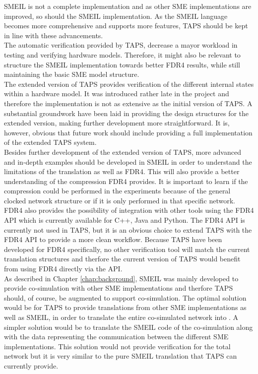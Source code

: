 
SMEIL is not a complete implementation and as other SME implementations are improved, so should the SMEIL implementation. As the SMEIL language becomes more comprehensive and supports more features, TAPS should be kept in line with these advancements.\\
The automatic verification provided by TAPS, decrease a mayor workload in testing and verifying hardware models. Therefore, it might also be relevant to structure the SMEIL implementation towards better FDR4 results, while still maintaining the basic SME model structure. \\

The extended version of TAPS provides verification of the different internal states within a hardware model. It was introduced rather late in the project and therefore the implementation is not as extensive as the initial version of TAPS. A substantial groundwork have been laid in providing the design structures for the extended version, making further development more straightforward. It is, however, obvious that future work should include providing a full implementation of the extended TAPS system. \\

Besides further development of the extended version of TAPS, more advanced and in-depth examples should be developed in SMEIL in order to understand the limitations of the translation as well as FDR4. This will also provide a better understanding of the compression FDR4 provides. It is important to learn if the compression could be performed in the experiments because of the general clocked network structure or if it is only performed in that specific network. \\

FDR4 also provides the possibility of integration with other tools using the FDR4 API which is currently available for C++, Java and Python. The FDR4 API is currently not used in TAPS, but it is an obvious choice to extend TAPS with the FDR4 API to provide a more clean workflow. Because TAPS have been developed for FDR4 specifically, no other verification tool will match the current translation structures and therfore the current version of TAPS would benefit from using FDR4 directly via the API.\\

As described in Chapter \ref{chap:background}, SMEIL was mainly developed to provide co-simulation with other SME implementations and therfore TAPS should, of course, be augmented to support co-simulation. The optimal solution would be for TAPS to provide translations from other SME implementations as well as SMEIL, in order to translate the entire co-simulated network into \cspm{}. A simpler solution would be to translate the SMEIL code of the co-simulation along with the data representing the communication between the different SME implementations. This solution would not provide verification for the total network but it is very similar to the pure SMEIL translation that TAPS can currently provide.\\


